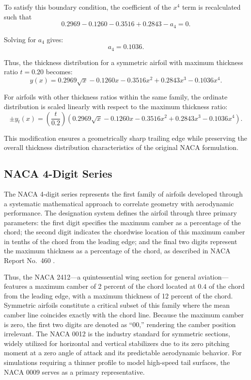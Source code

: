 To satisfy this boundary condition, the coefficient of the $x^4$ term
is recalculated such that
\[
0.2969
- 0.1260
- 0.3516
+ 0.2843
- a_4 = 0.
\]

Solving for $a_4$ gives:
\[
a_4 = 0.1036.
\]

Thus, the thickness distribution for a symmetric airfoil
with maximum thickness ratio $t= 0.20$ becomes:
\[
y(x) =
0.2969 \sqrt{x}
- 0.1260 x
- 0.3516 x^2
+ 0.2843 x^3
- 0.1036 x^4 .
\]

For airfoils with other thickness ratios within the same family,
the ordinate distribution is scaled linearly with respect to the
maximum thickness ratio:
\[
\pm y_t(x) =
\left(\frac{t}{0.2}\right)
\left(
0.2969 \sqrt{x}
- 0.1260 x
- 0.3516 x^2
+ 0.2843 x^3
- 0.1036 x^4
\right).
\]

This modification ensures a geometrically sharp trailing edge
while preserving the overall thickness distribution characteristics
of the original NACA formulation.


\subsection*{NACA 4-Digit Series}

The NACA 4-digit series represents the first family of airfoils developed through a systematic mathematical approach to correlate geometry with aerodynamic performance. 
The designation system defines the airfoil through three primary parameters:
the first digit specifies the maximum camber as a percentage of the chord;
the second digit indicates the chordwise location of this maximum camber in tenths of the chord from the leading edge; 
and the final two digits represent the maximum thickness as a percentage of the chord, as described in NACA Report No.~460 \cite{NACA_TR_460}. 

Thus, the NACA 2412—a quintessential wing section for general aviation—
features a maximum camber of 2 percent of the chord located at $0.4$ of the chord from the leading edge, with a maximum thickness of 12 percent of the chord. 
Symmetric airfoils constitute a critical subset of this family where the mean camber line coincides exactly with the chord line. 
Because the maximum camber is zero, the first two digits are denoted as ``00,'' rendering the camber position irrelevant. 
The NACA 0012 is the industry standard for symmetric sections, 
widely utilized for horizontal and vertical stabilizers due to its zero pitching moment at a zero angle of attack and its predictable aerodynamic behavior. 
For simulations requiring a thinner profile to model high-speed tail surfaces, the NACA 0009 serves as a primary representative.

